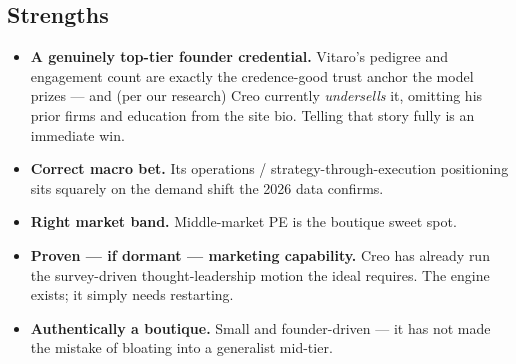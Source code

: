 \documentclass[11pt]{article}
\begin{document}
\subsection{Strengths}
\begin{itemize}
  \item \textbf{A genuinely top-tier founder credential.} Vitaro's pedigree and engagement
  count are exactly the credence-good trust anchor the model prizes --- and (per our
  research) Creo currently \emph{undersells} it, omitting his prior firms and education from
  the site bio. Telling that story fully is an immediate win.
  \item \textbf{Correct macro bet.} Its operations / strategy-through-execution positioning
  sits squarely on the demand shift the 2026 data confirms.
  \item \textbf{Right market band.} Middle-market PE is the boutique sweet spot.
  \item \textbf{Proven --- if dormant --- marketing capability.} Creo has already run the
  survey-driven thought-leadership motion the ideal requires. The engine exists; it simply
  needs restarting.
  \item \textbf{Authentically a boutique.} Small and founder-driven --- it has not made the
  mistake of bloating into a generalist mid-tier.
\end{itemize}
\end{document}
